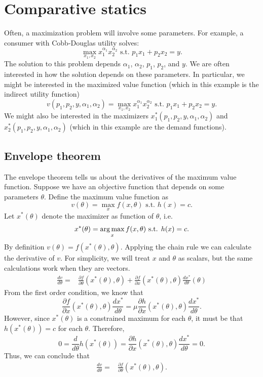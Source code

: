 \section{Comparative statics}

Often, a maximization problem will involve some parameters. For
example, a consumer with Cobb-Douglas utility solves:
\[ \max_{x_1,x_2} x_1^{\alpha_1} x_2^{\alpha_2} \text{ s.t. } p_1 x_1
+ p_2 x_2 = y. \]
The solution to this problem depends $\alpha_1$, $\alpha_2$, $p_1$,
$p_2$, and $y$. We are often interested in how the solution depends on
these parameters. In particular, we might be interested in the
maximized value function (which in this example is the indirect
utility function)
\[ v(p_1,p_2,y,\alpha_1,\alpha_2) = \max_{x_1,x_2} x_1^{\alpha_1}
x_2^{\alpha_2} \text{ s.t. } p_1 x_1 + p_2 x_2 = y. \]
We might also be interested in the maximizers
$x_1^*(p_1,p_2,y,\alpha_1,\alpha_2)$ and
$x_2^*(p_1,p_2,y,\alpha_1,\alpha_2)$ (which in this example are the
demand functions).  

\subsection{Envelope theorem}

The envelope theorem tells us about the derivatives of the maximum
value function. Suppose we have an objective function that depends on
some parameters $\theta$. Define the maximum value function as
\[ v(\theta) = \max_x f(x,\theta) \text{ s.t. } h(x) = c. \]
Let $x^*(\theta)$ denote the maximizer as function of $\theta$, i.e. 
\[ x^*(\theta) = \argmax_x f(x,\theta) \text{ s.t. } h(x) = c. \]
By definition $v(\theta) = f(x^*(\theta), \theta)$. Applying the chain
rule we can calculate the derivative of $v$. For simplicity, we will
treat $x$ and $\theta$ as scalars, but the same calculations work when
they are vectors.
\begin{align*} 
  \frac{dv}{d\theta} = & \frac{\partial f}{\partial \theta}(x^*(\theta),\theta) +
  \frac{\partial f}{\partial x}(x^*(\theta),\theta) \frac{d x^*}{d\theta}(\theta)
\end{align*}
From the first order condition, we know that 
\[ 
\frac{\partial f}{\partial x}(x^*(\theta),\theta) \frac{dx^*}{d\theta}
= 
\mu
\frac{\partial h}{\partial x}(x^*(\theta),\theta)
\frac{dx^*}{d\theta}. 
\]
However, since $x^*(\theta)$ is a constrained maximum for each
$\theta$, it must be that $h(x^*(\theta)) = c$ for each
$\theta$. Therefore, 
\[ 0 = \frac{d}{d\theta} h(x^*(\theta)) = \frac{\partial h}{\partial
  x}(x^*(\theta),\theta) \frac{dx^*}{d\theta} = 0. \]
Thus, we can conclude that
\begin{align*} 
  \frac{dv}{d\theta} = & \frac{\partial f}{\partial
    \theta}(x^*(\theta),\theta).
\end{align*}

